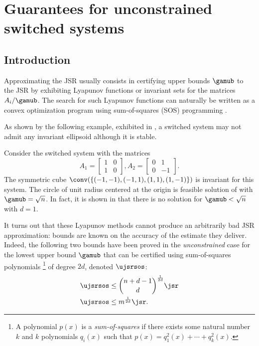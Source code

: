 \documentclass[11pt,twoside,a4paper,openright]{uclouvain-thesis}
\begin{document}
\section{Guarantees for unconstrained switched systems}
\label{sec:unconstrguarantee}

\subsection{Introduction}

Approximating the JSR usually consists in certifying upper bounds $\gamub$ to
the JSR by exhibiting Lyapunov functions or invariant sets for the matrices
$A_i/\gamub$. %
The search for such Lyapunov functions can naturally be written as a convex
optimization program using sum-of-squares (SOS) programming \cite{parrilo2008approximation}.

As shown by the following example, exhibited in \cite{ando1998simultaneous},
a switched system may not admit any invariant ellipsoid
although it is stable.
\begin{myexem}
  Consider the switched system with the matrices
  \begin{equation}
    \label{eq:ando2}
    A_1 =
    \begin{bmatrix}
      1 & 0\\
      1 & 0
    \end{bmatrix},
    A_2 =
    \begin{bmatrix}
      0 &  1\\
      0 & -1
    \end{bmatrix}.
  \end{equation}
  The symmetric cube $\conv(\{(-1, -1), (-1, 1), (1, 1), (1, -1)\})$
  is invariant for this system.
  The circle of unit radius centered at the origin is feasible
  solution of  with $\gamub = \sqrt{n}$.
  In fact, it is shown in \cite{ando1998simultaneous} that
  there is no solution for $\gamub < \sqrt{n}$ with $d = 1$.
\end{myexem}

It turns out that these Lyapunov methods cannot produce an arbitrarily bad JSR approximation:
bounds are known on the accuracy of the estimate they deliver.
Indeed, the following two bounds have been proved in the \emph{unconstrained} case
for the lowest upper bound $\gamub$ that can be certified using sum-of-squares polynomials%
\footnote{A polynomial $p(x)$ is a \emph{sum-of-squares} if there exists some
natural number $k$ and $k$ polynomials $q_i(x)$ such that
$p(x) = q_1^2(x) + \cdots + q_k^2(x)$.} of degree $2d$, denoted $\ujsrsos$:
\begin{align}
  \label{eq:nguarantee}
  \ujsrsos & \leq {n+d-1 \choose d}^{\frac{1}{2d}} \jsr\\
  \label{eq:mguarantee}
  \ujsrsos & \leq m^{\frac{1}{2d}} \jsr.
\end{align}
\end{document}
